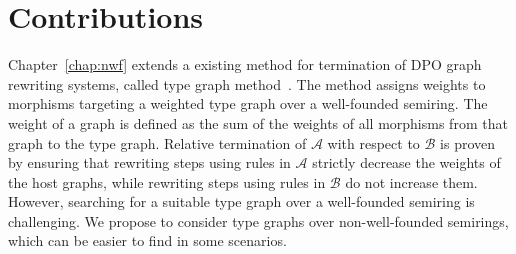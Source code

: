  
\section{Contributions}
Chapter~\ref{chap:nwf} extends a existing method for termination of DPO graph rewriting systems, called type graph method~\cite{zantema2014termination,bruggink2014termination,bruggink2015proving,endrullis2024generalized_icgt}. 
The method assigns weights to morphisms targeting a weighted type graph over a well-founded semiring. The weight of a graph is defined
 as the sum of the weights of all morphisms from that graph to the type graph. Relative termination of $\mathcal{A}$ with respect to $\mathcal{B}$ is proven by ensuring that rewriting steps using rules in \( \mathcal{A} \) strictly decrease the weights of the host graphs, while rewriting steps using rules in \( \mathcal{B} \) do not increase them. However, searching for a suitable type graph over a well-founded semiring is challenging. We propose to consider type graphs over non-well-founded semirings, which can be easier to find in some scenarios. 

